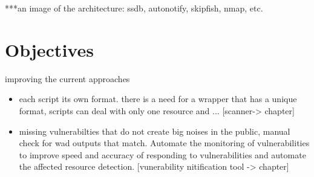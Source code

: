 ***an image of the architecture: ssdb, autonotify, skipfish, nmap, etc.


\section{Objectives}
improving the current approaches
\begin{itemize}
\item each script its own format. there is a need for a wrapper that has a unique format, scripts can deal with only one resource and ... [scanner-> chapter]
\item missing vulnerabilties that do not create big noises in the public, manual check for wad outputs that match. Automate the monitoring of vulnerabilities to improve speed and accuracy of responding to vulnerabilities and automate the affected resource detection. [vunerability nitification tool -> chapter]
\end{itemize}

























